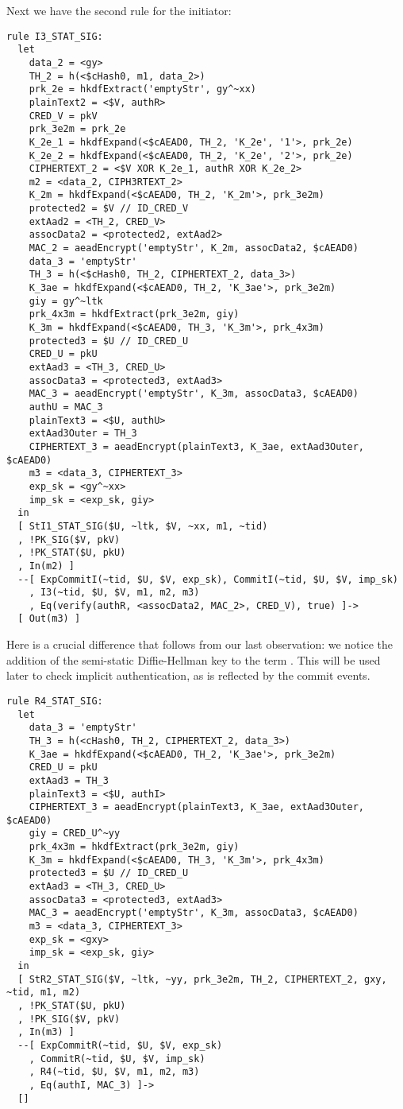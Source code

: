 Next we have the second rule for the initiator:
\begin{lstlisting}
rule I3_STAT_SIG:
  let
    data_2 = <gy> 
    TH_2 = h(<$cHash0, m1, data_2>)
    prk_2e = hkdfExtract('emptyStr', gy^~xx)
    plainText2 = <$V, authR> 
    CRED_V = pkV
    prk_3e2m = prk_2e
    K_2e_1 = hkdfExpand(<$cAEAD0, TH_2, 'K_2e', '1'>, prk_2e)
    K_2e_2 = hkdfExpand(<$cAEAD0, TH_2, 'K_2e', '2'>, prk_2e)
    CIPHERTEXT_2 = <$V XOR K_2e_1, authR XOR K_2e_2> 
    m2 = <data_2, CIPH3RTEXT_2>
    K_2m = hkdfExpand(<$cAEAD0, TH_2, 'K_2m'>, prk_3e2m)
    protected2 = $V // ID_CRED_V
    extAad2 = <TH_2, CRED_V> 
    assocData2 = <protected2, extAad2>
    MAC_2 = aeadEncrypt('emptyStr', K_2m, assocData2, $cAEAD0)
    data_3 = 'emptyStr' 
    TH_3 = h(<$cHash0, TH_2, CIPHERTEXT_2, data_3>)
    K_3ae = hkdfExpand(<$cAEAD0, TH_2, 'K_3ae'>, prk_3e2m)
    giy = gy^~ltk
    prk_4x3m = hkdfExtract(prk_3e2m, giy)
    K_3m = hkdfExpand(<$cAEAD0, TH_3, 'K_3m'>, prk_4x3m)
    protected3 = $U // ID_CRED_U
    CRED_U = pkU
    extAad3 = <TH_3, CRED_U>
    assocData3 = <protected3, extAad3>
    MAC_3 = aeadEncrypt('emptyStr', K_3m, assocData3, $cAEAD0)
    authU = MAC_3
    plainText3 = <$U, authU>
    extAad3Outer = TH_3
    CIPHERTEXT_3 = aeadEncrypt(plainText3, K_3ae, extAad3Outer, $cAEAD0)
    m3 = <data_3, CIPHERTEXT_3>
    exp_sk = <gy^~xx>
    imp_sk = <exp_sk, giy>
  in
  [ StI1_STAT_SIG($U, ~ltk, $V, ~xx, m1, ~tid) 
  , !PK_SIG($V, pkV)
  , !PK_STAT($U, pkU)
  , In(m2) ]
  --[ ExpCommitI(~tid, $U, $V, exp_sk), CommitI(~tid, $U, $V, imp_sk)
    , I3(~tid, $U, $V, m1, m2, m3)
    , Eq(verify(authR, <assocData2, MAC_2>, CRED_V), true) ]->
  [ Out(m3) ]
\end{lstlisting}
Here is a crucial difference that follows from our last observation: we notice
the addition of the semi-static Diffie-Hellman key to the term .
This will be used later to check implicit authentication, as is reflected by the
commit events.

\begin{lstlisting}
rule R4_STAT_SIG:
  let
    data_3 = 'emptyStr'
    TH_3 = h(<cHash0, TH_2, CIPHERTEXT_2, data_3>)
    K_3ae = hkdfExpand(<$cAEAD0, TH_2, 'K_3ae'>, prk_3e2m)
    CRED_U = pkU
    extAad3 = TH_3
    plainText3 = <$U, authI>
    CIPHERTEXT_3 = aeadEncrypt(plainText3, K_3ae, extAad3Outer, $cAEAD0)
    giy = CRED_U^~yy
    prk_4x3m = hkdfExtract(prk_3e2m, giy)
    K_3m = hkdfExpand(<$cAEAD0, TH_3, 'K_3m'>, prk_4x3m)
    protected3 = $U // ID_CRED_U
    extAad3 = <TH_3, CRED_U>
    assocData3 = <protected3, extAad3>
    MAC_3 = aeadEncrypt('emptyStr', K_3m, assocData3, $cAEAD0)
    m3 = <data_3, CIPHERTEXT_3>
    exp_sk = <gxy>
    imp_sk = <exp_sk, giy>
  in
  [ StR2_STAT_SIG($V, ~ltk, ~yy, prk_3e2m, TH_2, CIPHERTEXT_2, gxy, ~tid, m1, m2) 
  , !PK_STAT($U, pkU)
  , !PK_SIG($V, pkV)
  , In(m3) ]
  --[ ExpCommitR(~tid, $U, $V, exp_sk)
    , CommitR(~tid, $U, $V, imp_sk)
    , R4(~tid, $U, $V, m1, m2, m3)
    , Eq(authI, MAC_3) ]->
  []
\end{lstlisting}

